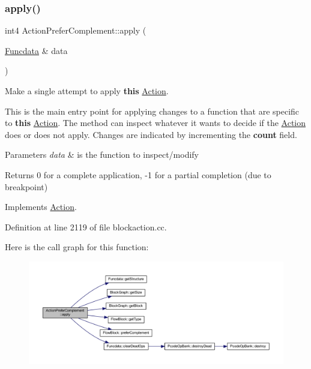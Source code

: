 \subsubsection{\texorpdfstring{apply()}{apply()}}
{\footnotesize\ttfamily int4 Action\+Prefer\+Complement\+::apply (\begin{DoxyParamCaption}\item[{\mbox{\hyperlink{class_funcdata}{Funcdata}} \&}]{data }\end{DoxyParamCaption})\hspace{0.3cm}{\ttfamily [virtual]}}



Make a single attempt to apply {\bfseries{this}} \mbox{\hyperlink{class_action}{Action}}. 

This is the main entry point for applying changes to a function that are specific to {\bfseries{this}} \mbox{\hyperlink{class_action}{Action}}. The method can inspect whatever it wants to decide if the \mbox{\hyperlink{class_action}{Action}} does or does not apply. Changes are indicated by incrementing the {\bfseries{count}} field. 
\begin{DoxyParams}{Parameters}
{\em data} & is the function to inspect/modify \\
\hline
\end{DoxyParams}
\begin{DoxyReturn}{Returns}
0 for a complete application, -\/1 for a partial completion (due to breakpoint) 
\end{DoxyReturn}


Implements \mbox{\hyperlink{class_action_aac1c3999d6c685b15f5d9765a4d04173}{Action}}.



Definition at line 2119 of file blockaction.\+cc.

Here is the call graph for this function\+:
\nopagebreak
\begin{figure}[H]
\begin{center}
\leavevmode
\includegraphics[width=350pt]{class_action_prefer_complement_a88227ed0c02b56ff86ffae3a02f8eff4_cgraph}
\end{center}
\end{figure}
\mbox{\label{class_action_prefer_complement_a39b68f861f1e99b1412cf78f5dff888a}} 

